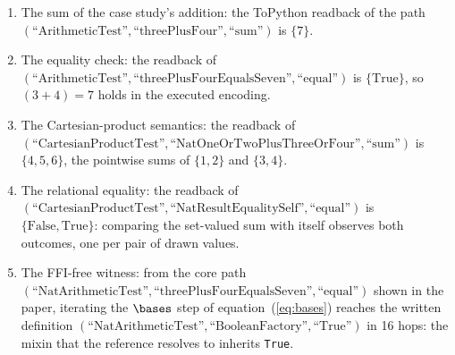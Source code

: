 \begin{enumerate}
  \item The sum of the case study's addition: the ToPython readback of the path $(\text{``ArithmeticTest''}, \text{``threePlusFour''}, \text{``sum''})$ is $\{\text{7}\}$.
  \item The equality check: the readback of $(\text{``ArithmeticTest''}, \text{``threePlusFourEqualsSeven''}, \text{``equal''})$ is $\{\text{True}\}$, so $(3+4) = 7$ holds in the executed encoding.
  \item The Cartesian-product semantics: the readback of $(\text{``CartesianProductTest''}, \text{``NatOneOrTwoPlusThreeOrFour''}, \text{``sum''})$ is $\{\text{4}, \text{5}, \text{6}\}$, the pointwise sums of $\{1, 2\}$ and $\{3, 4\}$.
  \item The relational equality: the readback of $(\text{``CartesianProductTest''}, \text{``NatResultEqualitySelf''}, \text{``equal''})$ is $\{\text{False}, \text{True}\}$: comparing the set-valued sum with itself observes both outcomes, one per pair of drawn values.
  \item The FFI-free witness: from the core path $(\text{``NatArithmeticTest''}, \text{``threePlusFourEqualsSeven''}, \text{``equal''})$ shown in the paper, iterating the $\bases$ step of equation~(\ref{eq:bases}) reaches the written definition $(\text{``NatArithmeticTest''}, \text{``BooleanFactory''}, \text{``True''})$ in 16 hops: the mixin that the reference resolves to inherits \texttt{True}.
\end{enumerate}
